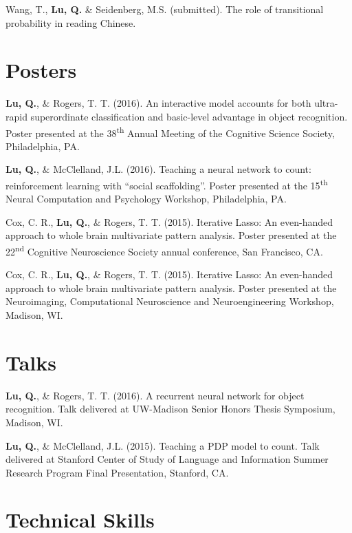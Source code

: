 \documentclass[11pt,a4paper,sans]{moderncv}        %
\newcommand{\ts}{\textsuperscript}
\begin{document}
\hangindent=0.7cm
Wang, T., \textbf{Lu, Q.} \& Seidenberg, M.S. (submitted). The role of transitional probability in reading Chinese. 


\section{Posters}
\hangindent=0.7cm
\textbf{Lu, Q.}, \& Rogers, T. T. (2016). An interactive model accounts for both ultra-rapid superordinate classification and basic-level advantage in object recognition. Poster presented at the 38\ts{th} Annual Meeting of the Cognitive Science Society, Philadelphia, PA.

\hangindent=0.7cm
\textbf{Lu, Q.}, \& McClelland, J.L. (2016). Teaching a neural network to count: reinforcement learning with ``social scaffolding''. Poster presented at the 15\ts{th} Neural Computation and Psychology Workshop, Philadelphia, PA.

\hangindent=0.7cm
Cox, C. R., \textbf{Lu, Q.}, \& Rogers, T. T. (2015). Iterative Lasso: An even-handed approach to whole brain multivariate pattern analysis. Poster presented at the 22\ts{nd} Cognitive Neuroscience Society annual conference, San Francisco, CA.

\hangindent=0.7cm
Cox, C. R., \textbf{Lu, Q.}, \& Rogers, T. T. (2015). Iterative Lasso: An even-handed approach to whole brain multivariate pattern analysis. Poster presented at the Neuroimaging, Computational Neuroscience and Neuroengineering Workshop, Madison, WI.


\section{Talks}
\hangindent=0.7cm
\textbf{Lu, Q.}, \& Rogers, T. T. (2016). A recurrent neural network for object recognition. Talk delivered at UW-Madison Senior Honors Thesis Symposium, Madison, WI.

\hangindent=0.7cm
\textbf{Lu, Q.}, \& McClelland, J.L. (2015). Teaching a PDP model to count. Talk delivered at Stanford Center of Study of Language and Information Summer Research Program Final Presentation, Stanford, CA. 



\section{Technical Skills}
\end{document}
